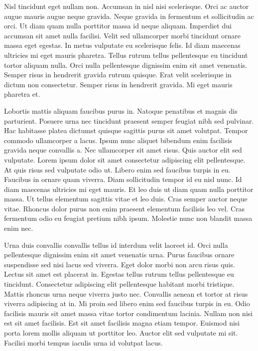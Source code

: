 Nisl tincidunt eget nullam non. Accumsan in nisl nisi scelerisque. Orci ac auctor augue mauris augue neque gravida. Neque gravida in fermentum et sollicitudin ac orci. Ut diam quam nulla porttitor massa id neque aliquam. Imperdiet dui accumsan sit amet nulla facilisi. Velit sed ullamcorper morbi tincidunt ornare massa eget egestas. In metus vulputate eu scelerisque felis. Id diam maecenas ultricies mi eget mauris pharetra. Tellus rutrum tellus pellentesque eu tincidunt tortor aliquam nulla. Orci nulla pellentesque dignissim enim sit amet venenatis. Semper risus in hendrerit gravida rutrum quisque. Erat velit scelerisque in dictum non consectetur. Semper risus in hendrerit gravida. Mi eget mauris pharetra et.

Lobortis mattis aliquam faucibus purus in. Natoque penatibus et magnis dis parturient. Posuere urna nec tincidunt praesent semper feugiat nibh sed pulvinar. Hac habitasse platea dictumst quisque sagittis purus sit amet volutpat. Tempor commodo ullamcorper a lacus. Ipsum nunc aliquet bibendum enim facilisis gravida neque convallis a. Nec ullamcorper sit amet risus. Quis auctor elit sed vulputate. Lorem ipsum dolor sit amet consectetur adipiscing elit pellentesque. At quis risus sed vulputate odio ut. Libero enim sed faucibus turpis in eu. Faucibus in ornare quam viverra. Diam sollicitudin tempor id eu nisl nunc. Id diam maecenas ultricies mi eget mauris. Et leo duis ut diam quam nulla porttitor massa. Ut tellus elementum sagittis vitae et leo duis. Cras semper auctor neque vitae. Rhoncus dolor purus non enim praesent elementum facilisis leo vel. Cras fermentum odio eu feugiat pretium nibh ipsum. Molestie nunc non blandit massa enim nec.

Urna duis convallis convallis tellus id interdum velit laoreet id. Orci nulla pellentesque dignissim enim sit amet venenatis urna. Purus faucibus ornare suspendisse sed nisi lacus sed viverra. Eget dolor morbi non arcu risus quis. Lectus sit amet est placerat in. Egestas tellus rutrum tellus pellentesque eu tincidunt. Consectetur adipiscing elit pellentesque habitant morbi tristique. Mattis rhoncus urna neque viverra justo nec. Convallis aenean et tortor at risus viverra adipiscing at in. Mi proin sed libero enim sed faucibus turpis in eu. Odio facilisis mauris sit amet massa vitae tortor condimentum lacinia. Nullam non nisi est sit amet facilisis. Est sit amet facilisis magna etiam tempor. Euismod nisi porta lorem mollis aliquam ut porttitor leo. Auctor elit sed vulputate mi sit. Facilisi morbi tempus iaculis urna id volutpat lacus.

